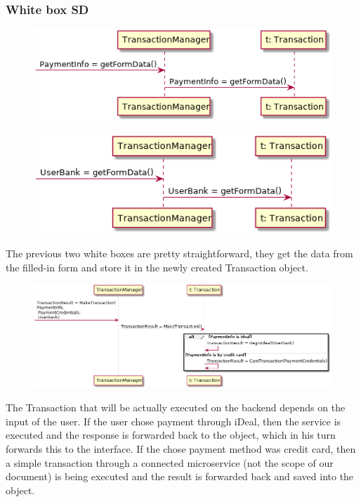 \subsubsection{White box SD}
\creator{\studentC}
\updater{\studentA}
\begin{figure}[H]
\includegraphics[scale=0.8]{Iteration_3/Files/UC1_wb1.png}
\end{figure}
\begin{figure}[H]
\includegraphics[scale=0.8]{Iteration_3/Files/UC1_wb2.png}
\end{figure}
The previous two white boxes are pretty straightforward, they get the data from the filled-in form and store it in the newly created Transaction object.
\begin{figure}[H]
\includegraphics[scale=0.5]{Iteration_3/Files/UC1_wb3.png}
\end{figure}
The Transaction that will be actually executed on the backend depends on the input of the user. If the user chose payment through iDeal, then the service is executed and the response is forwarded back to the object, which in his turn forwards this to the interface. If the chose payment method was credit card, then a simple transaction through a connected microservice (not the scope of our document) is being executed and the result is forwarded back and saved into the object.
